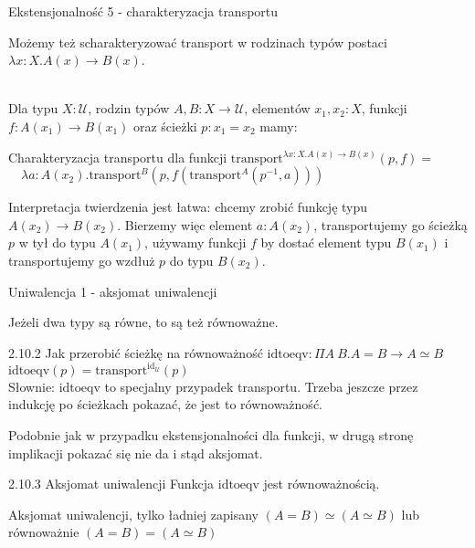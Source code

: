 \documentclass{beamer}
\newcommand{\U}{\mathcal{U}}
\newcommand{\id}{\text{id}}
\newcommand{\inv}[1]{#1^{-1}}
\newcommand{\transport}{\text{transport}}
\newcommand{\idtoeqv}{\text{idtoeqv}}
\begin{document}
\begin{frame}{Ekstensjonalność 5 - charakteryzacja transportu}

Możemy też scharakteryzować transport w rodzinach typów postaci $\lambda x : X. A(x) \to B(x)$. \\~\

Dla typu $X : \U$, rodzin typów $A, B : X \to \U$, elementów $x_1, x_2 : X$, funkcji $f : A(x_1) \to B(x_1)$ oraz ścieżki $p : x_1 = x_2$ mamy:

\begin{block}{Charakteryzacja transportu dla funkcji}
$\transport^{\lambda x : X. A(x) \to B(x)}(p, f) =$ \\
$\quad \lambda a : A(x_2). \transport^B(p, f(\transport^A(\inv{p}, a)))$
\end{block}

Interpretacja twierdzenia jest łatwa: chcemy zrobić funkcję typu $A(x_2) \to B(x_2)$. Bierzemy więc element $a : A(x_2)$, transportujemy go ścieżką $p$ w tył do typu $A(x_1)$, używamy funkcji $f$ by dostać element typu $B(x_1)$ i transportujemy go wzdłuż $p$ do typu $B(x_2)$.

\end{frame}

\begin{frame}{Uniwalencja 1 - aksjomat uniwalencji}

Jeżeli dwa typy są równe, to są też równoważne.

\begin{block}{2.10.2 Jak przerobić ścieżkę na równoważność}
$\idtoeqv: \Pi A\ B. A = B \to A \simeq B$ \\
$\idtoeqv(p) = \transport^{\id_\U}(p)$ \\

Słownie: $\idtoeqv$ to specjalny przypadek transportu. Trzeba jeszcze przez indukcję po ścieżkach pokazać, że jest to równoważność.
\end{block}

Podobnie jak w przypadku ekstensjonalności dla funkcji, w drugą stronę implikacji pokazać się nie da i stąd aksjomat.

\begin{block}{2.10.3 Aksjomat uniwalencji}
Funkcja $\idtoeqv$ jest równoważnością.
\end{block}

\begin{block}{Aksjomat uniwalencji, tylko ładniej zapisany}
$(A = B) \simeq (A \simeq B)$ lub równoważnie $(A = B) = (A \simeq B)$
\end{block}

\end{frame}
\end{document}
